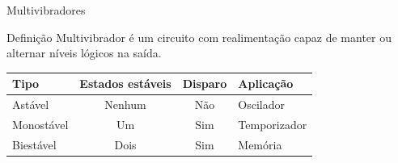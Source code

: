 \begin{frame}{Multivibradores}
\begin{block}{Definição}
Multivibrador é um circuito com realimentação capaz de manter ou alternar níveis lógicos na saída.
\end{block}
\begin{center}\renewcommand{\arraystretch}{1.35}
\begin{tabular}{l|c|c|l}
Tipo & Estados estáveis & Disparo & Aplicação \\
\hline
Astável & Nenhum & Não & Oscilador \\
Monostável & Um & Sim & Temporizador \\
Biestável & Dois & Sim & Memória \\
\end{tabular}\end{center}
\end{frame}